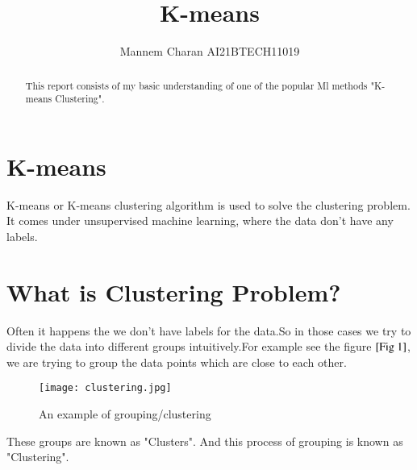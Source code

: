 \documentclass[journal,12pt,onecolumn]{IEEEtran}
\theoremstyle{remark}
\numberwithin{equation}{section}
\begin{document}
	  \title{K-means}
	  \author{ Mannem Charan AI21BTECH11019}
          \maketitle
	   \begin{abstract}
		This report consists of my basic understanding of one of the popular Ml methods "K-means Clustering".
	   \end{abstract}
           \section{K-means}
            K-means or K-means clustering algorithm is used to solve the clustering problem. It comes under unsupervised machine learning, where the data don't have any labels.
	   \section{What is Clustering Problem?}
	     Often it happens the we don't have labels for the data.So in those cases we try to divide the data into different groups intuitively.For example see the figure $\ref{Fig 1}$, we are trying to group the data points which are close to each other.\\
	     \begin{figure}
	       \centering
	       \texttt{[image: clustering.jpg]}
	       \caption{An example of grouping/clustering}
	       \label{Fig 1}
	      \end{figure}
         These groups are known as "Clusters". And this process of grouping is known as "Clustering".
\end{document}
